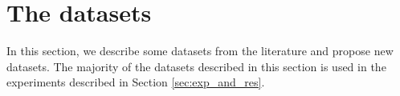 

\chapter{The datasets}

In this section, we describe some datasets from the literature and propose new datasets.
The majority of the datasets described in this section is used in the experiments described in Section \ref{sec:exp_and_res}.



